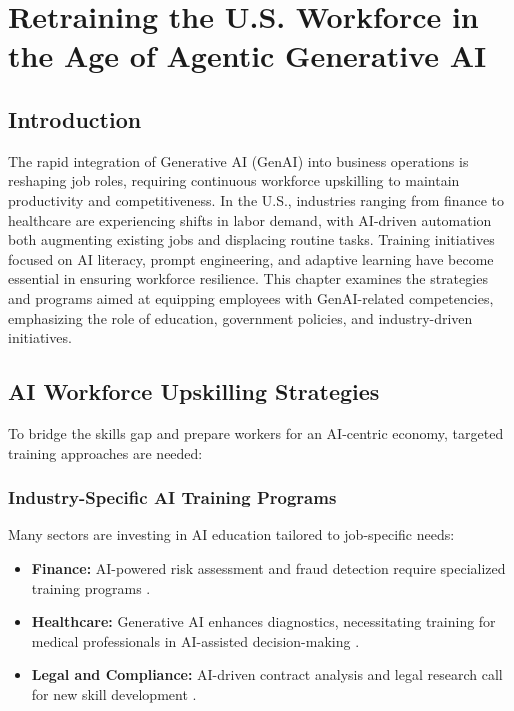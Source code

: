 \documentclass[a4paper,headinclude=on,footinclude=on,12pt,oneside]{scrbook}
\begin{document}
\chapter{Retraining the U.S. Workforce in the Age of Agentic Generative AI}


\section{Introduction}

The rapid integration of Generative AI (GenAI) into business operations is reshaping job roles, requiring continuous workforce upskilling to maintain productivity and competitiveness. In the U.S., industries ranging from finance to healthcare are experiencing shifts in labor demand, with AI-driven automation both augmenting existing jobs and displacing routine tasks. Training initiatives focused on AI literacy, prompt engineering, and adaptive learning have become essential in ensuring workforce resilience. This chapter examines the strategies and programs aimed at equipping employees with GenAI-related competencies, emphasizing the role of education, government policies, and industry-driven initiatives.

\section{AI Workforce Upskilling Strategies}

To bridge the skills gap and prepare workers for an AI-centric economy, targeted training approaches are needed:

\subsection{Industry-Specific AI Training Programs}

Many sectors are investing in AI education tailored to job-specific needs:
\begin{itemize}
	\item \textbf{Finance:} AI-powered risk assessment and fraud detection require specialized training programs \cite{diegoAIHandsonLLMs2024}.
	\item \textbf{Healthcare:} Generative AI enhances diagnostics, necessitating training for medical professionals in AI-assisted decision-making \cite{GenerativeArtificialIntelligence}.
	\item \textbf{Legal and Compliance:} AI-driven contract analysis and legal research call for new skill development \cite{StudentPGRGuidance}.
\end{itemize}
\end{document}
